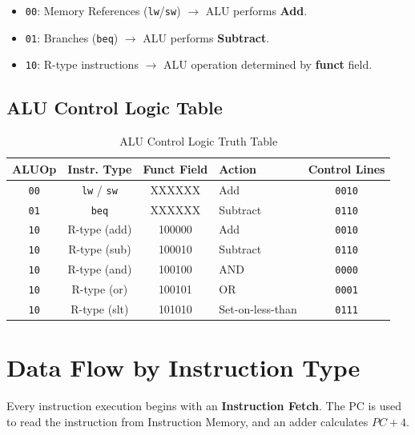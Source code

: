 \begin{proposition}

\begin{itemize}
    \item \texttt{00}: Memory References (\texttt{lw}/\texttt{sw}) $\rightarrow$ ALU performs \textbf{Add}.
    \item \texttt{01}: Branches (\texttt{beq}) $\rightarrow$ ALU performs \textbf{Subtract}.
    \item \texttt{10}: R-type instructions $\rightarrow$ ALU operation determined by \textbf{funct} field.
\end{itemize}

\end{proposition}

\subsection{ALU Control Logic Table}

\begin{table}[h]
\centering
\small
\begin{tabular}{c c c l c}
\toprule
\textbf{ALUOp} & \textbf{Instr. Type} & \textbf{Funct Field} & \textbf{Action} & \textbf{Control Lines} \\
\midrule
\texttt{00} & \texttt{lw} / \texttt{sw} & XXXXXX & Add & \texttt{0010} \\
\texttt{01} & \texttt{beq} & XXXXXX & Subtract & \texttt{0110} \\
\texttt{10} & R-type (add) & 100000 & Add & \texttt{0010} \\
\texttt{10} & R-type (sub) & 100010 & Subtract & \texttt{0110} \\
\texttt{10} & R-type (and) & 100100 & AND & \texttt{0000} \\
\texttt{10} & R-type (or) & 100101 & OR & \texttt{0001} \\
\texttt{10} & R-type (slt) & 101010 & Set-on-less-than & \texttt{0111} \\
\bottomrule
\end{tabular}
\caption{ALU Control Logic Truth Table}
\end{table}

\section{Data Flow by Instruction Type}

\begin{remark}
Every instruction execution begins with an \textbf{Instruction Fetch}. The PC is used to read the instruction from Instruction Memory, and an adder calculates $PC + 4$.
\end{remark}

